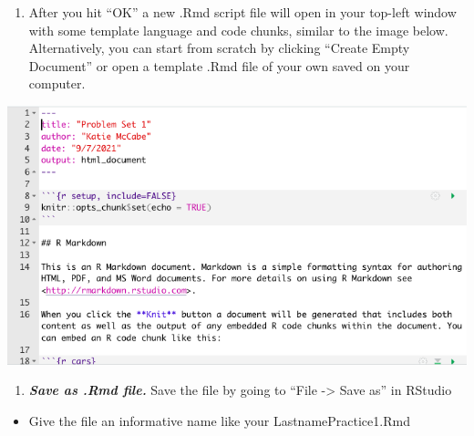 \documentclass[
  letterpaper,
  DIV=11,
  numbers=noendperiod]{scrreprt}
\providecommand{\tightlist}{%
  \setlength{\itemsep}{0pt}\setlength{\parskip}{0pt}}\usepackage{longtable,booktabs,array}
\begin{document}
\begin{enumerate}
\def\labelenumi{\arabic{enumi}.}
\setcounter{enumi}{2}
\tightlist
\item
  After you hit ``OK'' a new .Rmd script file will open in your top-left
  window with some template language and code chunks, similar to the
  image below. Alternatively, you can start from scratch by clicking
  ``Create Empty Document'' or open a template .Rmd file of your own
  saved on your computer.
\end{enumerate}

\includegraphics{images/rmarkdowntemplate.png}

\begin{enumerate}
\def\labelenumi{\arabic{enumi}.}
\setcounter{enumi}{3}
\tightlist
\item
  \textbf{\emph{Save as .Rmd file.}} Save the file by going to ``File
  -\textgreater{} Save as'' in RStudio
\end{enumerate}

\begin{itemize}
\tightlist
\item
  Give the file an informative name like your LastnamePractice1.Rmd
\end{itemize}
\end{document}
